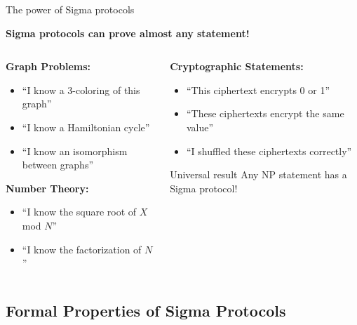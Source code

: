 \documentclass[aspectratio=169, lualatex, handout]{beamer}
\begin{document}
\begin{frame}{The power of Sigma protocols}
	\begin{center}
		\textbf{Sigma protocols can prove almost any statement!}
	\end{center}
	\vspace{0.5em}
	\begin{columns}[c]
		\begin{column}{0.5\textwidth}
			\textbf{Graph Problems:}
			\begin{itemize}
				\item ``I know a 3-coloring of this graph''
				\item ``I know a Hamiltonian cycle''
				\item ``I know an isomorphism between graphs''
			\end{itemize}
			\textbf{Number Theory:}
			\begin{itemize}
				\item ``I know the square root of $X$ mod $N$''
				\item ``I know the factorization of $N$''
			\end{itemize}
		\end{column}
		\begin{column}{0.5\textwidth}
			\textbf{Cryptographic Statements:}
			\begin{itemize}
				\item ``This ciphertext encrypts 0 or 1''
				\item ``These ciphertexts encrypt the same value''
				\item ``I shuffled these ciphertexts correctly''
			\end{itemize}
			\begin{alertblock}{Universal result}
				Any NP statement has a Sigma protocol!
			\end{alertblock}
		\end{column}
	\end{columns}
\end{frame}

\subsection{Formal Properties of Sigma Protocols}
\end{document}
